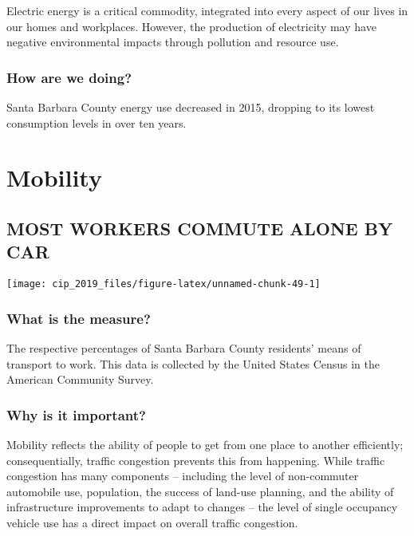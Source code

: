 \documentclass[]{book}
\theoremstyle{definition}
\theoremstyle{definition}
\theoremstyle{definition}
\theoremstyle{remark}
\begin{document}
Electric energy is a critical commodity, integrated into every aspect of
our lives in our homes and workplaces. However, the production of
electricity may have negative environmental impacts through pollution
and resource use.

\subsubsection*{How are we doing?}\label{how-are-we-doing-29}

Santa Barbara County energy use decreased in 2015, dropping to its
lowest consumption levels in over ten years.

\section*{Mobility}\label{mobility}

\subsection*{MOST WORKERS COMMUTE ALONE BY
CAR}\label{most-workers-commute-alone-by-car}

\texttt{[image: cip\_2019\_files/figure-latex/unnamed-chunk-49-1]}

\subsubsection*{What is the measure?}\label{what-is-the-measure-24}

The respective percentages of Santa Barbara County residents' means of
transport to work. This data is collected by the United States Census in
the American Community Survey.

\subsubsection*{Why is it important?}\label{why-is-it-important-23}

Mobility reflects the ability of people to get from one place to another
efficiently; consequentially, traffic congestion prevents this from
happening. While traffic congestion has many components -- including the
level of non-commuter automobile use, population, the success of
land-use planning, and the ability of infrastructure improvements to
adapt to changes -- the level of single occupancy vehicle use has a
direct impact on overall traffic congestion.
\end{document}
